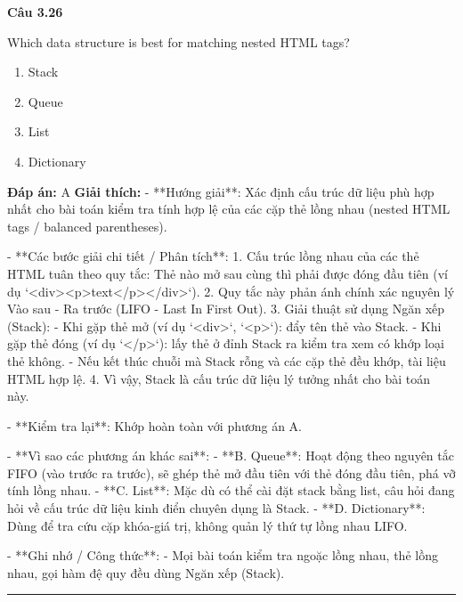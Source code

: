 \documentclass[11pt,a4paper]{article}
\newenvironment{question}[1]{%
  \par\vspace{1em}\noindent\textbf{\large Câu #1}\par\vspace{0.4em}
}{%
  \par\vspace{1em}\hrule\vspace{0.6em}
}
\newenvironment{choices}{%
  \begin{enumerate}[label=\textbf{\Alph*.},leftmargin=2.2em,itemsep=2pt,topsep=3pt]
}{%
  \end{enumerate}
}
\newcommand{\choice}{\item}
\begin{document}
\begin{question}{3.26}
Which data structure is best for matching nested HTML tags?
\begin{choices}
\choice Stack
\choice Queue
\choice List
\choice Dictionary
\end{choices}
\textbf{Đáp án:} A
\textbf{Giải thích:} - **Hướng giải**:
  Xác định cấu trúc dữ liệu phù hợp nhất cho bài toán kiểm tra tính hợp lệ của các cặp thẻ lồng nhau (nested HTML tags / balanced parentheses).

- **Các bước giải chi tiết / Phân tích**:
  1. Cấu trúc lồng nhau của các thẻ HTML tuân theo quy tắc: Thẻ nào mở sau cùng thì phải được đóng đầu tiên (ví dụ `<div><p>text</p></div>`).
  2. Quy tắc này phản ánh chính xác nguyên lý Vào sau - Ra trước (LIFO - Last In First Out).
  3. Giải thuật sử dụng Ngăn xếp (Stack):
     - Khi gặp thẻ mở (ví dụ `<div>`, `<p>`): đẩy tên thẻ vào Stack.
     - Khi gặp thẻ đóng (ví dụ `</p>`): lấy thẻ ở đỉnh Stack ra kiểm tra xem có khớp loại thẻ không.
     - Nếu kết thúc chuỗi mà Stack rỗng và các cặp thẻ đều khớp, tài liệu HTML hợp lệ.
  4. Vì vậy, Stack là cấu trúc dữ liệu lý tưởng nhất cho bài toán này.

- **Kiểm tra lại**:
  Khớp hoàn toàn với phương án A.

- **Vì sao các phương án khác sai**:
  - **B. Queue**: Hoạt động theo nguyên tắc FIFO (vào trước ra trước), sẽ ghép thẻ mở đầu tiên với thẻ đóng đầu tiên, phá vỡ tính lồng nhau.
  - **C. List**: Mặc dù có thể cài đặt stack bằng list, câu hỏi đang hỏi về cấu trúc dữ liệu kinh điển chuyên dụng là Stack.
  - **D. Dictionary**: Dùng để tra cứu cặp khóa-giá trị, không quản lý thứ tự lồng nhau LIFO.

- **Ghi nhớ / Công thức**:
  - Mọi bài toán kiểm tra ngoặc lồng nhau, thẻ lồng nhau, gọi hàm đệ quy đều dùng Ngăn xếp (Stack).
\end{question}
\end{document}
